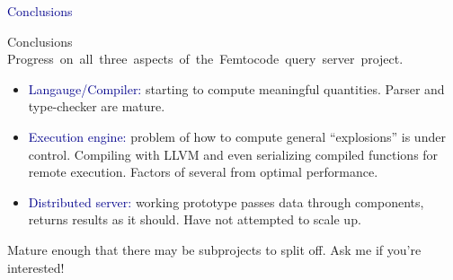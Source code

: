 \documentclass{beamer}
\begin{document}
\begin{frame}{}
\begin{center}
\LARGE \textcolor{darkblue}{Conclusions}
\end{center}
\end{frame}

\begin{frame}{Conclusions}
\vspace{0.3 cm}
\mbox{Progress on all three aspects of the Femtocode query server project.\hspace{-1 cm}}

\begin{itemize}
\item \textcolor{darkblue}{Langauge/Compiler:} starting to compute meaningful quantities. Parser and type-checker are mature.
\item \textcolor{darkblue}{Execution engine:} problem of how to compute general ``explosions'' is under control. Compiling with LLVM and even serializing compiled functions for remote execution. Factors of several from optimal performance.
\item \textcolor{darkblue}{Distributed server:} working prototype passes data through components, returns results as it should. Have not attempted to scale up.
\end{itemize}

Mature enough that there may be subprojects to split off. Ask me if you're interested!
\end{frame}
\end{document}
